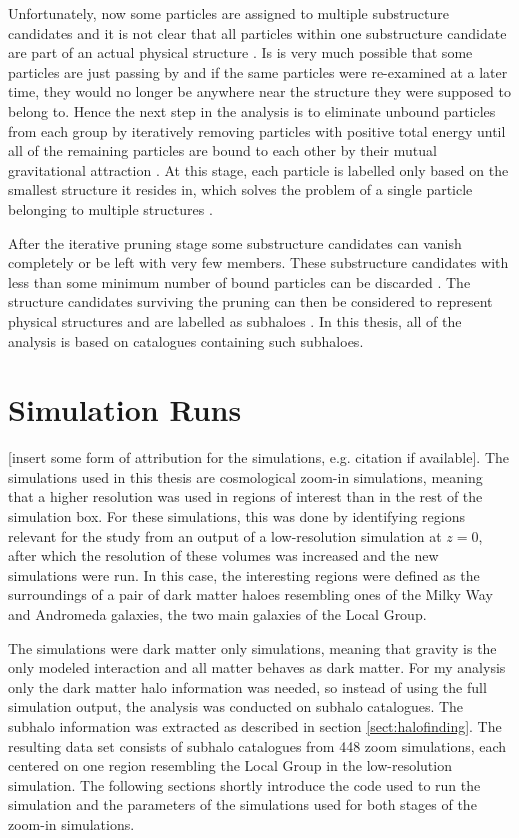 \documentclass[english, oneside]{HYgradu}
\begin{document}
Unfortunately, now some particles are assigned to multiple substructure candidates and it is not clear that all particles within one substructure candidate are part of an actual physical structure \citep{springel2001populating}. Is is very much possible that some particles are just passing by and if the same particles were re-examined at a later time, they would no longer be anywhere near the structure they were supposed to belong to. Hence the next step in the analysis is to eliminate unbound particles from each group by iteratively removing particles with positive total energy until all of the remaining particles are bound to each other by their mutual gravitational attraction \citep{springel2001populating}. At this stage, each particle is labelled only based on the smallest structure it resides in, which solves the problem of a single particle belonging to multiple structures \citep{springel2001populating}.

After the iterative pruning stage some substructure candidates can vanish completely or be left with very few members. These substructure candidates with less than some minimum number of bound particles can be discarded \citep{springel2001populating}. The structure candidates surviving the pruning can then be considered to represent physical structures and are labelled as subhaloes \citep{springel2001populating}. In this thesis, all of the analysis is based on catalogues containing such subhaloes. 

\section{Simulation Runs}
[insert some form of attribution for the simulations, e.g. citation if available]. %
The simulations used in this thesis are cosmological zoom-in simulations, meaning that a higher resolution was used in regions of interest than in the rest of the simulation box. For these simulations, this was done by identifying regions relevant for the study from an output of a low-resolution simulation at $z=0$, after which the resolution of these volumes was increased and the new simulations were run. In this case, the interesting regions were defined as the surroundings of a pair of dark matter haloes resembling ones of the Milky Way and Andromeda galaxies, the two main galaxies of the Local Group.

The simulations were dark matter only simulations, meaning that gravity is the only modeled interaction and all matter behaves as dark matter. For my analysis only the dark matter halo information was needed, so instead of using the full simulation output, the analysis was conducted on subhalo catalogues. The subhalo information was extracted as described in section \ref{sect:halofinding}. The resulting data set consists of subhalo catalogues from 448 zoom simulations, each centered on one region resembling the Local Group in the low-resolution simulation. The following sections shortly introduce the code used to run the simulation and the parameters of the simulations used for both stages of the zoom-in simulations.
\end{document}
